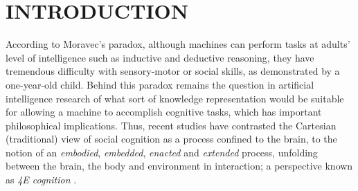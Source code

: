 \documentclass[letterpaper, 10 pt, conference]{ieeeconf}  %
\begin{document}
\begin{abstract}
		
	\end{abstract}
	
	
	\section{INTRODUCTION}
	
	According to Moravec's paradox, although machines can perform tasks at adults' level of intelligence such as inductive and deductive reasoning, they have tremendous difficulty with sensory-motor or social skills, as demonstrated by a one-year-old child. Behind this paradox remains the question in artificial intelligence research of what sort of knowledge representation would be suitable for allowing a machine to accomplish cognitive tasks, which has important philosophical implications. Thus, recent studies have contrasted the Cartesian (traditional) view of social cognition as a process confined to the brain, to the notion of an \textit{embodied}, \textit{embedded}, \textit{enacted} and \textit{extended} process, unfolding between the brain, the body and environment in interaction; a perspective known as \textit{4E cognition} \cite{Newen2018}.      
	
\end{document}
